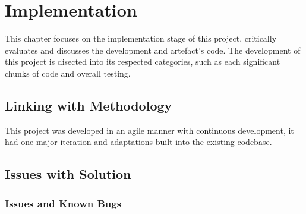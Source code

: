 \chapter{Implementation}

This chapter focuses on the implementation stage of this project, critically evaluates and discusses the development and artefact's code. The development of this project is disected into its respected categories, such as each significant chunks of code and overall testing.

\section{Linking with Methodology}

This project was developed in an agile manner with continuous development, it had one major iteration and adaptations built into the existing codebase.

\section{Issues with Solution}

\subsection{Issues and Known Bugs}

